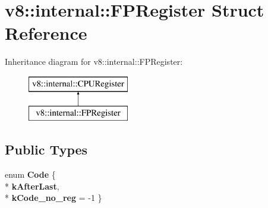 \hypertarget{structv8_1_1internal_1_1_f_p_register}{}\section{v8\+:\+:internal\+:\+:F\+P\+Register Struct Reference}
\label{structv8_1_1internal_1_1_f_p_register}
Inheritance diagram for v8\+:\+:internal\+:\+:F\+P\+Register\+:\begin{figure}[H]
\begin{center}
\leavevmode
\includegraphics[height=2.000000cm]{structv8_1_1internal_1_1_f_p_register}
\end{center}
\end{figure}
\subsection*{Public Types}
\begin{DoxyCompactItemize}
\item 
enum {\bfseries Code} \{ \\*
{\bfseries k\+After\+Last}, 
\\*
{\bfseries k\+Code\+\_\+no\+\_\+reg} = -\/1
 \}\hypertarget{structv8_1_1internal_1_1_f_p_register_af3bedaf31ed2841aeb524a6792a06c8e}{}\label{structv8_1_1internal_1_1_f_p_register_af3bedaf31ed2841aeb524a6792a06c8e}

\end{DoxyCompactItemize}
